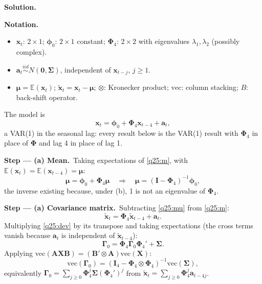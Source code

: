 \documentclass[11pt,a4paper]{article}
\numberwithin{equation}{questao}   %
\newenvironment{notacao}{\par\smallskip\noindent\textbf{Notation.}\begin{itemize}[leftmargin=1.4em,topsep=1pt,itemsep=0pt]\small}{\end{itemize}}
\newcommand{\passo}[2]{\par\smallskip\noindent\textbf{Step --- #1.}~#2}
\newcommand{\solhead}{\par\medskip\noindent{\color{blue!55!black}\rule{\linewidth}{0.3pt}}\par\noindent\textbf{Solution.}}
\newcommand{\E}{\mathbb{E}}
\begin{document}
\begin{sol}
\solhead
\begin{notacao}
\item $\mathbf x_t$: $2\times1$; $\boldsymbol\phi_0$: $2\times1$ constant; $\boldsymbol\Phi_4$: $2\times2$ with
  eigenvalues $\lambda_1,\lambda_2$ (possibly complex).
\item $\mathbf a_t\overset{iid}{\sim}N(\mathbf 0,\boldsymbol\Sigma)$, independent of $\mathbf x_{t-j}$, $j\ge1$.
\item $\boldsymbol\mu=\E(\mathbf x_t)$; $\tilde{\mathbf x}_t=\mathbf x_t-\boldsymbol\mu$; $\otimes$: Kronecker product;
  $\mathrm{vec}$: column stacking; $B$: back-shift operator.
\end{notacao}
The model is
\begin{equation}\label{q25:m}
\mathbf x_t=\boldsymbol\phi_0+\boldsymbol\Phi_4\mathbf x_{t-4}+\mathbf a_t ,
\end{equation}
a VAR(1) in the seasonal lag: every result below is the VAR(1) result with $\boldsymbol\Phi_4$ in place
of $\boldsymbol\Phi$ and lag 4 in place of lag 1.

\passo{(a) Mean}{Taking expectations of \eqref{q25:m}, with $\E(\mathbf x_t)=\E(\mathbf x_{t-4})=\boldsymbol\mu$:}
\begin{equation}\label{q25:mu}
\boldsymbol\mu=\boldsymbol\phi_0+\boldsymbol\Phi_4\boldsymbol\mu\quad\Longrightarrow\quad
\boldsymbol\mu=(\mathbf I-\boldsymbol\Phi_4)^{-1}\boldsymbol\phi_0 ,
\end{equation}
the inverse existing because, under (b), 1 is not an eigenvalue of $\boldsymbol\Phi_4$.

\passo{(a) Covariance matrix}{Subtracting \eqref{q25:mu} from \eqref{q25:m}:}
\begin{equation}\label{q25:dev}
\tilde{\mathbf x}_t=\boldsymbol\Phi_4\tilde{\mathbf x}_{t-4}+\mathbf a_t .
\end{equation}
Multiplying \eqref{q25:dev} by its transpose and taking expectations (the cross terms vanish because
$\mathbf a_t$ is independent of $\tilde{\mathbf x}_{t-4}$):
\begin{equation}\label{q25:G0}
\boldsymbol\Gamma_0=\boldsymbol\Phi_4\boldsymbol\Gamma_0\boldsymbol\Phi_4'+\boldsymbol\Sigma .
\end{equation}
Applying $\mathrm{vec}(\mathbf A\mathbf X\mathbf B)=(\mathbf B'\otimes\mathbf A)\mathrm{vec}(\mathbf X)$:
\begin{equation}\label{q25:vec}
\mathrm{vec}(\boldsymbol\Gamma_0)=(\mathbf I_4-\boldsymbol\Phi_4\otimes\boldsymbol\Phi_4)^{-1}\mathrm{vec}(\boldsymbol\Sigma),
\end{equation}
equivalently $\boldsymbol\Gamma_0=\sum_{j\ge0}\boldsymbol\Phi_4^j\boldsymbol\Sigma(\boldsymbol\Phi_4')^j$ from
$\tilde{\mathbf x}_t=\sum_{j\ge0}\boldsymbol\Phi_4^j\mathbf a_{t-4j}$.


\end{sol}
\end{document}
